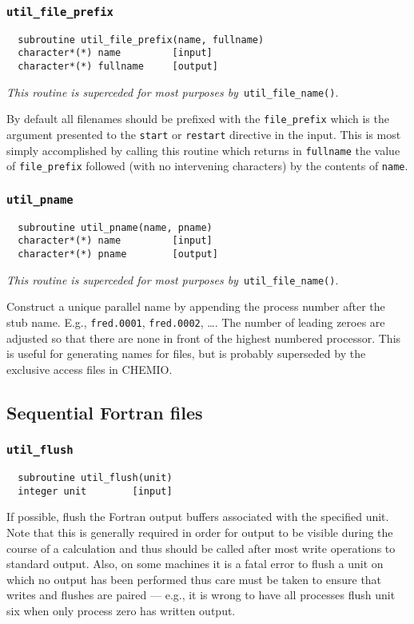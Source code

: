 \subsubsection{{\tt util\_file\_prefix}}
\begin{verbatim}
  subroutine util_file_prefix(name, fullname)
  character*(*) name         [input]
  character*(*) fullname     [output]
\end{verbatim}
{\em This routine is superceded for most purposes by}\ 
\verb+util_file_name()+.  

By default all filenames should be prefixed
with the \verb+file_prefix+ which is the argument presented to the
\verb+start+ or \verb+restart+ directive in the input.  This is most
simply accomplished by calling this routine which returns in
\verb+fullname+ the value of \verb+file_prefix+ followed (with no
intervening characters) by the contents of \verb+name+.

\subsubsection{{\tt util\_pname}}
\begin{verbatim}
  subroutine util_pname(name, pname)
  character*(*) name         [input]
  character*(*) pname        [output]
\end{verbatim}
{\em This routine is superceded for most purposes by}\ 
\verb+util_file_name()+.  

Construct a unique parallel name by appending the process number after
the stub name. E.g., \verb+fred.0001+, \verb+fred.0002+, \ldots. The
number of leading zeroes are adjusted so that there are none in front
of the highest numbered processor.  This is useful for generating
names for files, but is probably superseded by the exclusive access
files in CHEMIO.

\subsection{Sequential Fortran files}

\subsubsection{{\tt util\_flush}}
\begin{verbatim}
  subroutine util_flush(unit)
  integer unit        [input]
\end{verbatim}
If possible, flush the Fortran output buffers associated with the
specified unit.  Note that this is generally required in order for
output to be visible during the course of a calculation and thus
should be called after most write operations to standard output.
Also, on some machines it is a fatal error to flush a unit on which no
output has been performed thus care must be taken to ensure that
writes and flushes are paired --- e.g., it is wrong to have all
processes flush unit six when only process zero has written output.

